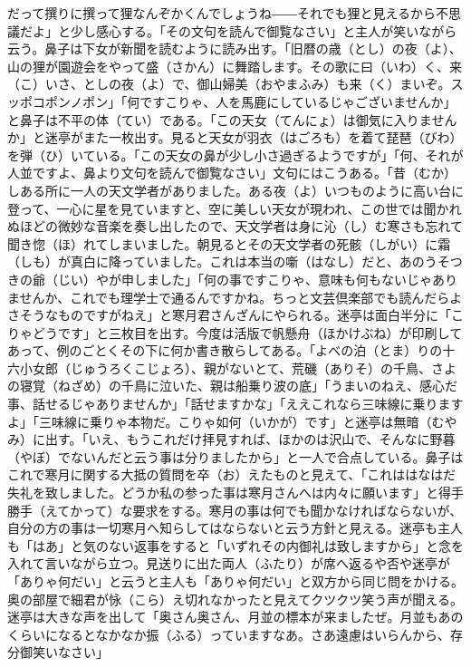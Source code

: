 \documentclass{book}
\begin{document}
だって撰りに撰って狸なんぞかくんでしょうね――それでも狸と見えるから不思議だよ」と少し感心する。「その文句を読んで御覧なさい」と主人が笑いながら云う。鼻子は下女が新聞を読むように読み出す。「旧暦の歳（とし）の夜（よ）、山の狸が園遊会をやって盛（さかん）に舞踏します。その歌に曰（いわ）く、来（こ）いさ、としの夜（よ）で、御山婦美（おやまふみ）も来（く）まいぞ。スッポコポンノポン」「何ですこりゃ、人を馬鹿にしているじゃございませんか」と鼻子は不平の体（てい）である。「この天女（てんにょ）は御気に入りませんか」と迷亭がまた一枚出す。見ると天女が羽衣（はごろも）を着て琵琶（びわ）を弾（ひ）いている。「この天女の鼻が少し小さ過ぎるようですが」「何、それが人並ですよ、鼻より文句を読んで御覧なさい」文句にはこうある。「昔（むか）しある所に一人の天文学者がありました。ある夜（よ）いつものように高い台に登って、一心に星を見ていますと、空に美しい天女が現われ、この世では聞かれぬほどの微妙な音楽を奏し出したので、天文学者は身に沁（し）む寒さも忘れて聞き惚（ほ）れてしまいました。朝見るとその天文学者の死骸（しがい）に霜（しも）が真白に降っていました。これは本当の噺（はなし）だと、あのうそつきの爺（じい）やが申しました」「何の事ですこりゃ、意味も何もないじゃありませんか、これでも理学士で通るんですかね。ちっと文芸倶楽部でも読んだらよさそうなものですがねえ」と寒月君さんざんにやられる。迷亭は面白半分に「こりゃどうです」と三枚目を出す。今度は活版で帆懸舟（ほかけぶね）が印刷してあって、例のごとくその下に何か書き散らしてある。「よべの泊（とま）りの十六小女郎（じゅうろくこじょろ）、親がないとて、荒磯（ありそ）の千鳥、さよの寝覚（ねざめ）の千鳥に泣いた、親は船乗り波の底」「うまいのねえ、感心だ事、話せるじゃありませんか」「話せますかな」「ええこれなら三味線に乗りますよ」「三味線に乗りゃ本物だ。こりゃ如何（いかが）です」と迷亭は無暗（むやみ）に出す。「いえ、もうこれだけ拝見すれば、ほかのは沢山で、そんなに野暮（やぼ）でないんだと云う事は分りましたから」と一人で合点している。鼻子はこれで寒月に関する大抵の質問を卒（お）えたものと見えて、「これははなはだ失礼を致しました。どうか私の参った事は寒月さんへは内々に願います」と得手勝手（えてかって）な要求をする。寒月の事は何でも聞かなければならないが、自分の方の事は一切寒月へ知らしてはならないと云う方針と見える。迷亭も主人も「はあ」と気のない返事をすると「いずれその内御礼は致しますから」と念を入れて言いながら立つ。見送りに出た両人（ふたり）が席へ返るや否や迷亭が「ありゃ何だい」と云うと主人も「ありゃ何だい」と双方から同じ問をかける。奥の部屋で細君が怺（こら）え切れなかったと見えてクツクツ笑う声が聞える。迷亭は大きな声を出して「奥さん奥さん、月並の標本が来ましたぜ。月並もあのくらいになるとなかなか振（ふる）っていますなあ。さあ遠慮はいらんから、存分御笑いなさい」
\end{document}
